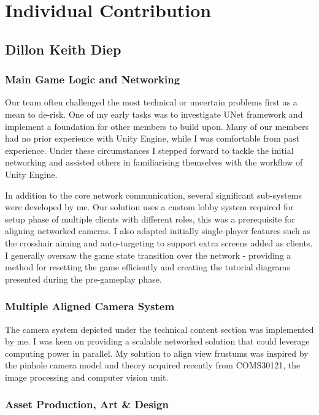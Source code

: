 \documentclass[a4paper,11pt]{article}
\begin{document}
\section{Individual Contribution}

\subsection{Dillon Keith Diep}

\subsubsection{Main Game Logic and Networking}

Our team often challenged the most technical or uncertain problems first as a mean to de-risk. One of my early tasks was to investigate UNet framework and implement a foundation for other members to build upon. Many of our members had no prior experience with Unity Engine, while I was comfortable from past experience. Under these circumstances I stepped forward to tackle the initial networking and assisted others in familiarising themselves with the workflow of Unity Engine.

In addition to the core network communication, several significant sub-systems were developed by me. Our solution uses a custom lobby system required for setup phase of multiple clients with different roles, this was a prerequisite for aligning networked cameras. I also adapted initially single-player features such as the crosshair aiming and auto-targeting to support extra screens added as clients. I generally oversaw the game state transition over the network - providing a method for resetting the game efficiently and creating the tutorial diagrams presented during the pre-gameplay phase.

\subsubsection{Multiple Aligned Camera System}

The camera system depicted under the technical content section was implemented by me. I was keen on providing a scalable networked solution that could leverage computing power in parallel.  My solution to align view frustums was inspired by the pinhole camera model and theory acquired recently from COMS30121, the image processing and computer vision unit.

\subsubsection{Asset Production, Art \& Design}
\end{document}
